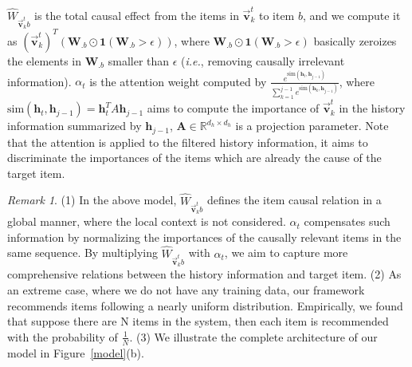 \documentclass[conference]{IEEEtran}
\theoremstyle{definition}
\theoremstyle{theorem}
\theoremstyle{proof}
\theoremstyle{remark}
\newtheorem*{remark}{Remark}
\begin{document}
$\hat{{W}}_{\vec{\bm{v}}_k^{t}b}$ is the total causal effect from the items in $\vec{\bm{v}}_k^{t}$ to item $b$, and we compute it as 
$(\vec{\bm{v}}_k^{t})^T(\bm{W}_{.b}\odot\bm{1}(\bm{W}_{.b}>\epsilon))$, where $\bm{W}_{.b}\odot\bm{1}(\bm{W}_{.b}>\epsilon)$ basically zeroizes the elements in $\bm{W}_{.b}$ smaller than $\epsilon$ (\emph{i.e.}, removing causally irrelevant information).
$\alpha_t$ is the attention weight computed by $\frac{e^{\text{sim}(\bm{h}_{t},\bm{h}_{j-1})}}{\sum_{k=1}^{j-1} e^{\text{sim}(\bm{h}_{k},\bm{h}_{j-1})}}$,
where $\text{sim}(\bm{h}_{t},\bm{h}_{j-1}) = \bm{h}_{t}^TA\bm{h}_{j-1}$ aims to compute the importance of $\vec{\bm{v}}_k^{t}$ in the history information summarized by $\bm{h}_{j-1}$, $\bm{A}\in \mathbb{R}^{d_h\times d_h}$ is a projection parameter.
Note that the attention is applied to the filtered history information, it aims to discriminate the importances of the items which are already the cause of the target item.

\begin{remark}
(1) In the above model, $\hat{{W}}_{\vec{\bm{v}}_k^{t}b}$ defines the item causal relation in a global manner, where the local context is not considered.
$\alpha_t$ compensates such information by normalizing the importances of the causally relevant items in the same sequence.
By multiplying $\hat{{W}}_{\vec{\bm{v}}_k^{t}b}$ with $\alpha_t$, we aim to capture more comprehensive relations between the history information and target item.
(2) {As an extreme case, where we do not have any training data, our framework recommends items following a nearly uniform distribution.
Empirically, we found that suppose there are N items in the system, then each item is recommended with the probability of $\frac{1}{N}$.}
(3) We illustrate the complete architecture of our model in Figure~\ref{model}(b).
\end{remark}
\end{document}
